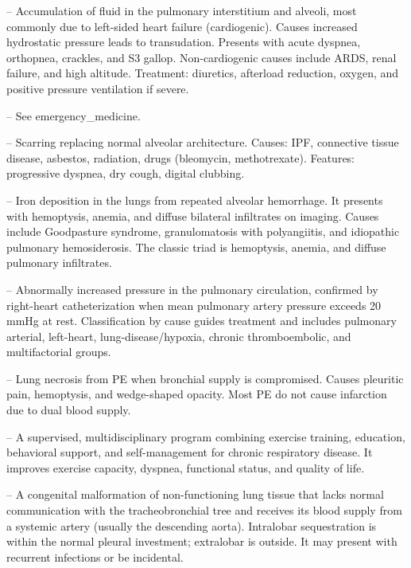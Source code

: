 -- Accumulation of fluid in the pulmonary interstitium and alveoli, most commonly due to left-sided heart failure (cardiogenic). Causes increased hydrostatic pressure leads to transudation. Presents with acute dyspnea, orthopnea, crackles, and S3 gallop. Non-cardiogenic causes include ARDS, renal failure, and high altitude. Treatment: diuretics, afterload reduction, oxygen, and positive pressure ventilation if severe.

-- See emergency\_medicine.

-- Scarring replacing normal alveolar architecture. Causes: IPF, connective tissue disease, asbestos, radiation, drugs (bleomycin, methotrexate). Features: progressive dyspnea, dry cough, digital clubbing.

-- Iron deposition in the lungs from repeated alveolar hemorrhage. It presents with hemoptysis, anemia, and diffuse bilateral infiltrates on imaging. Causes include Goodpasture syndrome, granulomatosis with polyangiitis, and idiopathic pulmonary hemosiderosis. The classic triad is hemoptysis, anemia, and diffuse pulmonary infiltrates.

-- Abnormally increased pressure in the pulmonary circulation, confirmed by right-heart catheterization when mean pulmonary artery pressure exceeds 20 mmHg at rest. Classification by cause guides treatment and includes pulmonary arterial, left-heart, lung-disease/hypoxia, chronic thromboembolic, and multifactorial groups.

-- Lung necrosis from PE when bronchial supply is compromised. Causes pleuritic pain, hemoptysis, and wedge-shaped opacity. Most PE do not cause infarction due to dual blood supply.

-- A supervised, multidisciplinary program combining exercise training, education, behavioral support, and self-management for chronic respiratory disease. It improves exercise capacity, dyspnea, functional status, and quality of life.

-- A congenital malformation of non-functioning lung tissue that lacks normal communication with the tracheobronchial tree and receives its blood supply from a systemic artery (usually the descending aorta). Intralobar sequestration is within the normal pleural investment; extralobar is outside. It may present with recurrent infections or be incidental.

